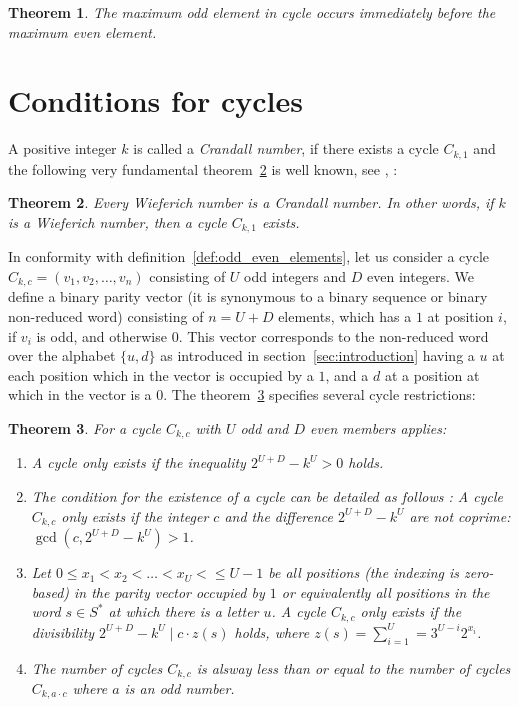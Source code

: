 \documentclass[12pt]{amsart}
\newtheorem{theorem}{Theorem}[section]
\theoremstyle{definition}
\begin{document}
\begin{theorem}
	\label{theo:max}
	The maximum odd element in cycle occurs immediately before the maximum even element.
\end{theorem}

\section{Conditions for cycles}
A positive integer $k$ is called a \textit{Crandall number}, if there exists a cycle $C_{k,1}$ and the following very fundamental theorem~\ref{theo:crandall_wieferich} is well known, see \cite{Ref_Crandall_1978}, \cite{Ref_Franco_Pomerance_1995}:

\begin{theorem}
\label{theo:crandall_wieferich}
Every Wieferich number is a Crandall number. In other words, if $k$ is a Wieferich number, then a cycle $C_{k,1}$ exists.
\end{theorem}

In conformity with definition~\ref{def:odd_even_elements}, let us consider a cycle $C_{k,c}=(v_1,v_2,\ldots,v_n)$ consisting of $U$ odd integers and $D$ even integers. We define a binary parity vector (it is synonymous to a binary sequence or binary non-reduced word) consisting of $n=U+D$ elements, which has a $1$ at position $i$, if $v_i$ is odd, and otherwise $0$. This vector corresponds to the non-reduced word over the alphabet $\{u,d\}$ as introduced in section~\ref{sec:introduction} having a $u$ at each position which in the vector is occupied by a $1$, and a $d$ at a position at which in the vector is a $0$. The theorem~\ref{theo:cycle_restriction_1} specifies several cycle restrictions:

\begin{theorem}
\label{theo:cycle_restriction_1}
For a cycle $C_{k,c}$ with $U$ odd and $D$ even members applies:
\par
\begin{enumerate}[label=(\alph*)]
\item A cycle only exists if the inequality $2^{U+D}-k^U>0$ holds.
\item The condition for the existence of a cycle can be detailed as follows \cite{Ref_Cox_2012}: A cycle $C_{k,c}$ only exists if the integer $c$ and the difference $2^{U+D}-k^U$ are not coprime: $\gcd(c,2^{U+D}-k^U)>1$.
\item Let $0\le x_1<x_2<\ldots<x_{U}<\le U-1$ be all positions (the indexing is zero-based) in the parity vector occupied by $1$ or equivalently all positions in the word $s\in S^\ast$ at which there is a letter $u$. A cycle $C_{k,c}$ only exists if the divisibility $2^{U+D}-k^U\mid c\cdot z(s)$ holds, where $z(s)=\sum_{i=1}^{U}=3^{U-i}2^{x_i}$.
\item The number of cycles $C_{k,c}$ is alsway less than or equal to the number of cycles $C_{k,a\cdot c}$ where $a$ is an odd number.
\end{enumerate}
\end{theorem}
\end{document}
